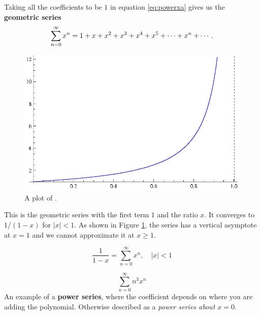     Taking all the coefficients to be $1$ in equation \eqref{eq:powerxa}
    gives us the \textbf{geometric series}
    \begin{equation}\label{eq:geopower}
      \sum_{n=0}^{\infty} x^n = 1 + x + x^2 + x^3 + x^4 + x^5 + \cdots + x^n  + \cdots.
    \end{equation}
    \cite[p. 575]{thomas}
    \begin{figure}[H]
      \begin{center}
        \includegraphics{continuous/series/geopower}
      \end{center}
      \caption{A plot of .\label{fig:geopower}}
    \end{figure}
    This is the geometric series with the first term $1$ and the ratio $x$.
    It converges to $1/(1-x)$ for $|x|<1.$ As shown in Figure
    \ref{fig:geopower}, the series has a vertical asymptote at $x=1$ and we
    cannot approximate it at $x \geq 1$.
    \begin{theorem}
      \label{th:recipowser}
      \begin{equation}
        \frac{1}{1-x} = \sum_{n=0}^{\infty}x^n, \quad |x| < 1
      \end{equation}
    \end{theorem}
\begin{ex}
  \[ \sum^\infty_{n=0} n^3 x^n   \]
  An example of a \textbf{power series}, where the coefficient depends on where
  you are adding the polynomial.\label{powerseriesex1}
  Otherwise described as a \emph{power series about \(x=0\)}.
\end{ex}
